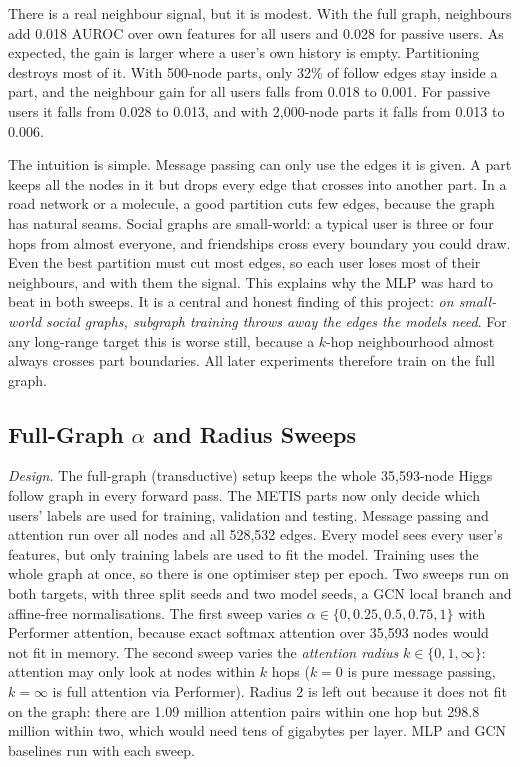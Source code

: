 There is a real neighbour signal, but it is modest. With the full graph, neighbours add 0.018 AUROC over own features for all users and 0.028 for passive users. As expected, the gain is larger where a user's own history is empty. Partitioning destroys most of it. With 500-node parts, only 32\% of follow edges stay inside a part, and the neighbour gain for all users falls from 0.018 to 0.001. For passive users it falls from 0.028 to 0.013, and with 2,000-node parts it falls from 0.013 to 0.006.

The intuition is simple. Message passing can only use the edges it is given. A part keeps all the nodes in it but drops every edge that crosses into another part. In a road network or a molecule, a good partition cuts few edges, because the graph has natural seams. Social graphs are small-world: a typical user is three or four hops from almost everyone, and friendships cross every boundary you could draw. Even the best partition must cut most edges, so each user loses most of their neighbours, and with them the signal. This explains why the MLP was hard to beat in both sweeps. It is a central and honest finding of this project: \emph{on small-world social graphs, subgraph training throws away the edges the models need}. For any long-range target this is worse still, because a $k$-hop neighbourhood almost always crosses part boundaries. All later experiments therefore train on the full graph.

\subsection{Full-Graph $\alpha$ and Radius Sweeps}
\emph{Design.} The full-graph (transductive) setup keeps the whole 35,593-node Higgs follow graph in every forward pass. The METIS parts now only decide which users' labels are used for training, validation and testing. Message passing and attention run over all nodes and all 528,532 edges. Every model sees every user's features, but only training labels are used to fit the model. Training uses the whole graph at once, so there is one optimiser step per epoch. Two sweeps run on both targets, with three split seeds and two model seeds, a GCN local branch and affine-free normalisations. The first sweep varies $\alpha \in \{0, 0.25, 0.5, 0.75, 1\}$ with Performer attention, because exact softmax attention over 35,593 nodes would not fit in memory. The second sweep varies the \emph{attention radius} $k \in \{0, 1, \infty\}$: attention may only look at nodes within $k$ hops ($k=0$ is pure message passing, $k=\infty$ is full attention via Performer). Radius 2 is left out because it does not fit on the graph: there are 1.09 million attention pairs within one hop but 298.8 million within two, which would need tens of gigabytes per layer. MLP and GCN baselines run with each sweep.

